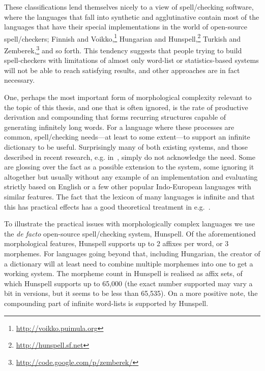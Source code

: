 \documentclass[officiallayout]{unihelcompling}
\begin{document}
These classifications lend themselves nicely to a view of spell\-/checking
software, where the languages that fall into synthetic and agglutinative
contain most of the languages that have their special implementations in the
world of open-source spell\-/checkers; Finnish and
Voikko,\footnote{\url{http://voikko.puimula.org}} Hungarian and
Hunspell,\footnote{\url{http://hunspell.sf.net}} Turkish and
Zemberek,\footnote{\url{http://code.google.com/p/zemberek/}} and so forth.
This tendency suggests that people trying to build spell-checkers with
limitations of almost only word-list or statistics-based systems will not be
able to reach satisfying results, and other approaches are in fact necessary.

One, perhaps the most important form of morphological complexity relevant to
the topic of this thesis, and one that is often ignored, is the rate of
productive derivation and compounding that forms recurring structures capable
of generating infinitely long words. For a language where these processes are
common, spell\-/checking needs---at least to some extent---to support an
infinite dictionary to be useful. Surprisingly many of both existing systems,
and those described in recent research, e.g.
in~\cite{hassan2008language,watson2003new}, simply do not acknowledge the need.
Some are glossing over the fact as a possible extension to the system, some
ignoring it altogether but usually without any example of an implementation and
evaluating strictly based on English or a few other popular Indo-European
languages with similar features.  The fact that the lexicon of many languages
is infinite and that this has practical effects has a good theoretical
treatment in e.g.~\citet{kornai2002many}.

To illustrate the practical issues with morphologically complex languages we
use the \emph{de facto} open-source spell\-/checking system, Hunspell. Of the
aforementioned morphological features, Hunspell supports up to 2 affixes per
word, or 3 morphemes. For languages going beyond that, including Hungarian, the
creator of a dictionary will at least need to combine multiple morphemes into
one to get a working system. The morpheme count in Hunspell is realised as
affix sets, of which Hunspell supports up to 65,000 (the exact number supported
may vary a bit in versions, but it seems to be less than 65,535). On a more
positive note, the compounding part of infinite word-lists is supported by
Hunspell.
\end{document}
